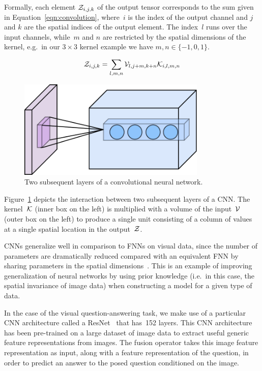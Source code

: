 Formally, each element $\mathcal{Z}_{i, j, k}$ of the output tensor corresponds to the
sum given in Equation~\ref{eqn:convolution}, where~$i$ is the index of the
output channel and $j$ and $k$ are the spatial indices of the output element.
The index~$l$ runs over the input channels, while~$m$ and $n$ are restricted by
the spatial dimensions of the kernel, e.g.\ in our $3 \times 3$ kernel example
we have $m, n \in \{-1, 0, 1\}$.

\begin{equation}
        \mathcal{Z}_{i, j, k} = \sum_{l, m, n} \mathcal{V}_{l, j + m, k + n} \mathcal{K}_{i, l, m, n}
\label{eqn:convolution}
\end{equation}

\begin{figure}
\centering
\includegraphics[width=0.8\textwidth]{Figures/cnn.pdf}
\caption{Two subsequent layers of a convolutional neural network.}
\label{fig:cnn}
\end{figure}

Figure~\ref{fig:cnn} depicts the interaction between two subsequent layers of a
CNN\@. The kernel~$\mathcal{K}$ (inner box on the left) is multiplied with a
volume of the input~$\mathcal{V}$ (outer box on the left) to produce a single unit
consisting of a column of values at a single spatial location in the
output~$\mathcal{Z}$.

CNNs generalize well in comparison to FNNs on visual data, since the number of
parameters are dramatically reduced compared with an equivalent FNN by sharing
parameters in the spatial dimensions~\cite{lecun-89}. This is an example of
improving generalization of neural networks by using prior knowledge (i.e.\ in
this case, the spatial invariance of image data) when constructing a model for
a given type of data.

In the case of the visual question-answering task, we make use of a particular
CNN architecture called a ResNet~\cite{he2016deep} that has~\num{152} layers.
This CNN architecture has been pre-trained on a large dataset of image data to
extract useful generic feature representations from images.
The fusion operator takes this image feature representation as input, along
with a feature representation of the question, in order to predict an answer to
the posed question conditioned on the image.


